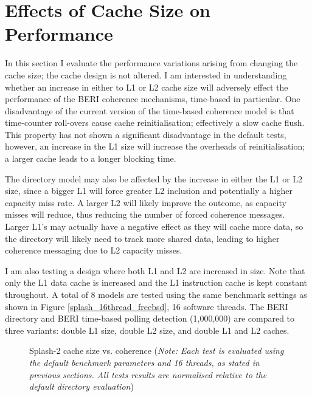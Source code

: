 	\section{Effects of Cache Size on Performance}
		In this section I evaluate the performance variations arising from changing the cache size; the cache design is not altered. 
		I am interested in understanding whether an increase in either to L1 or L2 cache size will adversely effect the performance of the BERI coherence mechanisms, time-based in particular. 
		One disadvantage of the current version of the time-based coherence model is that time-counter roll-overs cause cache reinitialisation; effectively a slow cache flush. This property has not shown a significant disadvantage in the default tests, however, an increase in the L1 size will increase the overheads of reinitialisation; a larger cache leads to a longer blocking time.
		
		The directory model may also be affected by the increase in either the L1 or L2 size, since a bigger L1 will force greater L2 inclusion and potentially a higher capacity miss rate. A larger L2 will likely improve the outcome, as capacity misses will reduce, thus reducing the number of forced coherence messages. Larger L1's may actually have a negative effect as they will cache more data, so the directory will likely need to track more shared data, leading to higher coherence messaging due to L2 capacity misses.
		
		I am also testing a design where both L1 and L2 are increased in size. Note that only the L1 data cache is increased and the L1 instruction cache is kept constant throughout. A total of 8 models are tested using the same benchmark settings as shown in Figure \ref{splash_16thread_freebsd}, 16 software threads. The BERI directory and BERI time-based polling detection (1,000,000) are compared to three variants: double L1 size, double L2 size, and double L1 and L2 caches.

		\begin{figure}[!h]
		\centering 
			\vspace{-3mm}
			\caption[Splash-2 cache size vs. coherence]{Splash-2 cache size vs. coherence (\textit{Note: Each test is evaluated using the default benchmark parameters and 16 threads, as stated in previous sections. All tests results are normalised relative to the default directory evaluation})} 
			\label{splash_big_cache_full}
		\end{figure}


